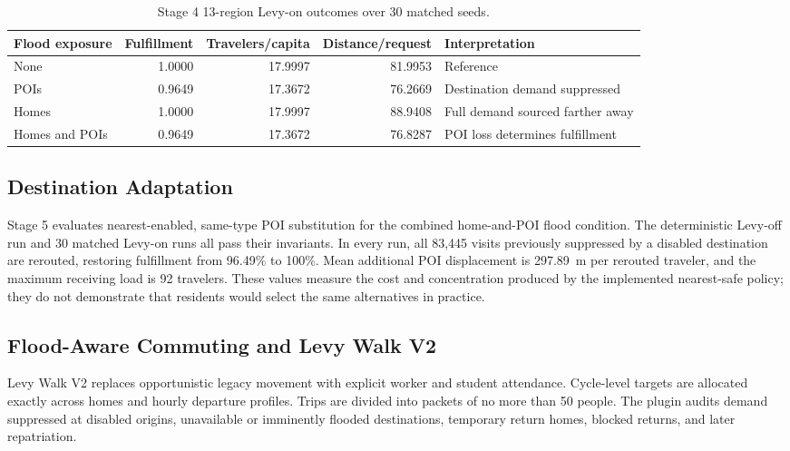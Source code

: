 \documentclass[pdflatex,sn-mathphys-num]{sn-jnl}%
\theoremstyle{thmstyleone}%
\theoremstyle{thmstyletwo}%
\theoremstyle{thmstylethree}%
\begin{document}
\begin{table}[ht]
\centering
\footnotesize
\caption{Stage 4 13-region Levy-on outcomes over 30 matched seeds.}
\label{tbl:popular_core}
\begin{tabularx}{\linewidth}{@{}lrrrX@{}}
\toprule
\textbf{Flood exposure} & \textbf{Fulfillment} & \textbf{Travelers/capita} & \textbf{Distance/request} & \textbf{Interpretation} \\ \midrule
None & 1.0000 & 17.9997 & 81.9953 & Reference \\ 
POIs & 0.9649 & 17.3672 & 76.2669 & Destination demand suppressed \\ 
Homes & 1.0000 & 17.9997 & 88.9408 & Full demand sourced farther away \\ 
Homes and POIs & 0.9649 & 17.3672 & 76.8287 & POI loss determines fulfillment \\ \bottomrule
\end{tabularx}
\end{table}

\subsection{Destination Adaptation}

Stage 5 evaluates nearest-enabled, same-type POI substitution for the combined home-and-POI flood condition. The deterministic Levy-off run and 30 matched Levy-on runs all pass their invariants. In every run, all 83,445 visits previously suppressed by a disabled destination are rerouted, restoring fulfillment from 96.49\% to 100\%. Mean additional POI displacement is 297.89~m per rerouted traveler, and the maximum receiving load is 92 travelers. These values measure the cost and concentration produced by the implemented nearest-safe policy; they do not demonstrate that residents would select the same alternatives in practice.

\subsection{Flood-Aware Commuting and Levy Walk V2}

Levy Walk V2 replaces opportunistic legacy movement with explicit worker and student attendance. Cycle-level targets are allocated exactly across homes and hourly departure profiles. Trips are divided into packets of no more than 50 people. The plugin audits demand suppressed at disabled origins, unavailable or imminently flooded destinations, temporary return homes, blocked returns, and later repatriation.
\end{document}
